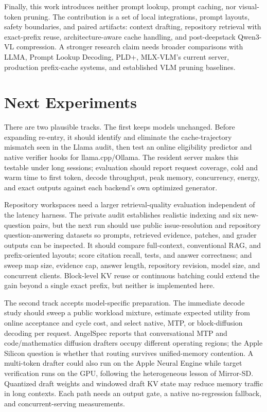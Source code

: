 \documentclass[11pt]{article}
\begin{document}
Finally, this work introduces neither prompt lookup, prompt caching, nor visual-token pruning. The contribution is a set of local integrations, prompt layouts, safety boundaries, and paired artifacts: context drafting, repository retrieval with exact-prefix reuse, architecture-aware cache handling, and post-deepstack Qwen3-VL compression. A stronger research claim needs broader comparisons with LLMA, Prompt Lookup Decoding, PLD+, MLX-VLM's current server, production prefix-cache systems, and established VLM pruning baselines.

\section{Next Experiments}
There are two plausible tracks. The first keeps models unchanged. Before expanding re-entry, it should identify and eliminate the cache-trajectory mismatch seen in the Llama audit, then test an online eligibility predictor and native verifier hooks for llama.cpp/Ollama. The resident server makes this testable under long sessions; evaluation should report request coverage, cold and warm time to first token, decode throughput, peak memory, concurrency, energy, and exact outputs against each backend's own optimized generator.

Repository workspaces need a larger retrieval-quality evaluation independent of
the latency harness. The private audit establishes realistic indexing and six
new-question pairs, but the next run should use public issue-resolution and
repository question-answering datasets so prompts, retrieved evidence, patches,
and grader outputs can be inspected. It should compare full-context,
conventional RAG, and prefix-oriented layouts; score citation recall, tests, and
answer correctness; and sweep map size, evidence cap, answer length, repository
revision, model size, and concurrent clients. Block-level KV reuse or continuous
batching could extend the gain beyond a single exact prefix, but neither is
implemented here.

The second track accepts model-specific preparation. The immediate decode study
should sweep a public workload mixture, estimate expected utility from online
acceptance and cycle cost, and select native, MTP, or block-diffusion decoding per
request. AngelSpec reports that conversational MTP and code/mathematics diffusion
drafters occupy different operating regions; the Apple Silicon question is whether
that routing survives unified-memory contention. A multi-token drafter could also
run on the Apple Neural Engine while target verification runs on the GPU, following
the heterogeneous lesson of Mirror-SD. Quantized draft weights and windowed draft
KV state may reduce memory traffic in long contexts. Each path needs an output gate,
a native no-regression fallback, and concurrent-serving measurements.
\end{document}

